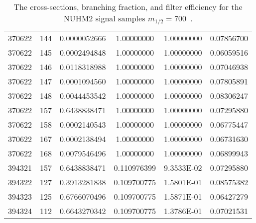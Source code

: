\begin{table}[htp]
{{\begin{tabular}{cccccc}
370622 & 144 & 0.0000052666 & 1.00000000 & 1.00000000 & 0.07856700\\
370622 & 145 & 0.0002494848 & 1.00000000 & 1.00000000 & 0.06059516\\
370622 & 146 & 0.0118318988 & 1.00000000 & 1.00000000 & 0.07046938\\
370622 & 147 & 0.0001094560 & 1.00000000 & 1.00000000 & 0.07805891\\
370622 & 148 & 0.0044453542 & 1.00000000 & 1.00000000 & 0.08306247\\
370622 & 157 & 0.6438838471 & 1.00000000 & 1.00000000 & 0.07295880\\
370622 & 158 & 0.0002140543 & 1.00000000 & 1.00000000 & 0.06775447\\
370622 & 167 & 0.0002138494 & 1.00000000 & 1.00000000 & 0.06731630\\
370622 & 168 & 0.0079546496 & 1.00000000 & 1.00000000 & 0.06899943\\
394321 & 157 & 0.6438838471 & 0.110976399 & 9.3533E-02 & 0.07295880\\
394322 & 127 & 0.3913281838 & 0.109700775 & 1.5801E-01 & 0.08575382\\
394323 & 125 & 0.6766070496 & 0.109700775 & 1.5871E-01 & 0.06427279\\
394324 & 112 & 0.6643270342 & 0.109700775 & 1.3786E-01 & 0.07021531\\
\hline
\hline
\end{tabular}
}
}
\caption{The cross-sections, branching fraction, and filter efficiency for the NUHM2 signal samples $m_{1/2} = 700$~{\GeV}.}
\label{tab:app_xsec_m12_700}
\end{table}%

